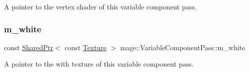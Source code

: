 A pointer to the vertex shader of this variable component pass. \hypertarget{classmage_1_1_variable_component_pass_a2b018f6481e6e5aa043223ce6821725d}{}\label{classmage_1_1_variable_component_pass_a2b018f6481e6e5aa043223ce6821725d} 
\subsubsection{\texorpdfstring{m\+\_\+white}{m\_white}}
{\footnotesize\ttfamily const \hyperlink{namespacemage_a1e01ae66713838a7a67d30e44c67703e}{Shared\+Ptr}$<$ const \hyperlink{classmage_1_1_texture}{Texture} $>$ mage\+::\+Variable\+Component\+Pass\+::m\+\_\+white\hspace{0.3cm}{\ttfamily [private]}}

A pointer to the with texture of this variable component pass. 